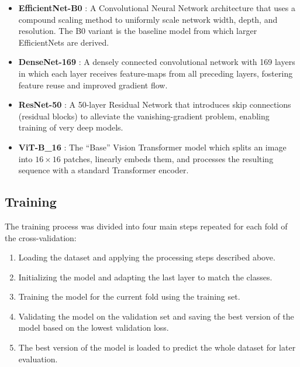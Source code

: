     \begin{itemize}
        \item \textbf{EfficientNet-B0} \autocite{tanEfficientNetRethinkingModel2019}:  
        A Convolutional Neural Network architecture that uses a compound scaling method to uniformly scale network width, depth, and resolution.  
        The B0 variant is the baseline model from which larger EfficientNets are derived.  

        \item \textbf{DenseNet-169} \autocite{huangDenselyConnectedConvolutional2017}:  
        A densely connected convolutional network with 169 layers in which each layer receives feature-maps from all preceding layers, fostering feature reuse and improved gradient flow.  

        \item \textbf{ResNet-50} \autocite{heDeepResidualLearning2016}:  
        A 50-layer Residual Network that introduces skip connections (residual blocks) to alleviate the vanishing-gradient problem, enabling training of very deep models.  

        \item \textbf{ViT-B\_16} \autocite{dosovitskiyImageWorth16x162021}:  
        The “Base” Vision Transformer model which splits an image into \(16\times 16\) patches, linearly embeds them, and processes the resulting sequence with a standard Transformer encoder.  
    \end{itemize}

    \subsection{Training}

    The training process was divided into four main steps repeated for each fold of the cross-validation:
    \begin{enumerate}
        \item Loading the dataset and applying the processing steps described above.
        \item Initializing the model and adapting the last layer to match the classes.
        \item Training the model for the current fold using the training set.
        \item Validating the model on the validation set and saving the best version of the model based on the lowest validation loss.
        \item The best version of the model is loaded to predict the whole dataset for later evaluation.
    \end{enumerate}

